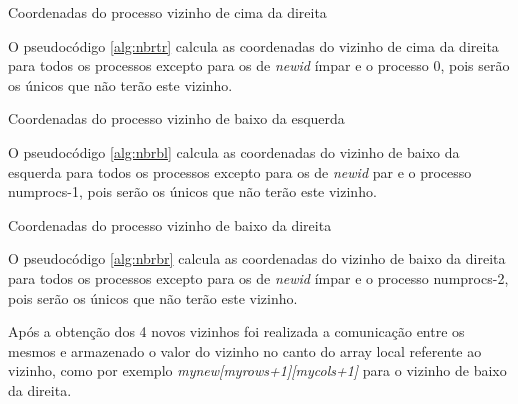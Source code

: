 \documentclass[10pt]{extarticle}
\begin{document}
\begin{algorithm}[H]
   
 \caption{Coordenadas do processo vizinho de cima da direita}
 \label{alg:nbrtr}
 \end{algorithm}
 
O pseudocódigo \ref{alg:nbrtr} calcula as coordenadas do vizinho de cima da direita para todos os processos excepto para os de \textit{newid} ímpar e o processo 0, pois serão os únicos que não terão este vizinho. 
 
 \begin{algorithm}[H]
   
 \caption{Coordenadas do processo vizinho de baixo da esquerda}
 \label{alg:nbrbl}
 \end{algorithm}
 
O pseudocódigo \ref{alg:nbrbl} calcula as coordenadas do vizinho de baixo da esquerda para todos os processos excepto para os de \textit{newid} par e o processo numprocs-1, pois serão os únicos que não terão este vizinho. 
 
 \begin{algorithm}[H]
   
 \caption{Coordenadas do processo vizinho de baixo da direita}
 \label{alg:nbrbr}
 \end{algorithm}

O pseudocódigo \ref{alg:nbrbr} calcula as coordenadas do vizinho de baixo da direita para todos os processos excepto para os de \textit{newid} ímpar e o processo numprocs-2, pois serão os únicos que não terão este vizinho. 

Após a obtenção dos 4 novos vizinhos foi realizada a comunicação entre os mesmos e armazenado o valor do vizinho no canto do array local referente ao vizinho, como por exemplo \textit{mynew[myrows+1][mycols+1]} para o vizinho de  baixo da direita.
\end{document}
